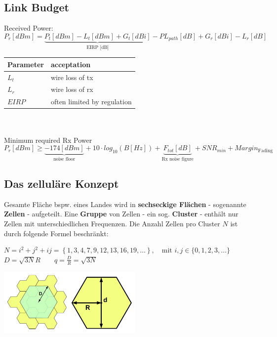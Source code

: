 \subsection{Link Budget}
Received Power:
\begin{equation}
	P_r [dBm] = \underbrace{P_t [dBm] - L_t [dBm] + G_t[dBi]}_{ \text{EIRP [dB]} } - PL_{path}[dB] + G_r[dBi] -L_r[dB]
\end{equation}

\begin{tabular}{ll}
\textbf{Parameter} & \textbf{acceptation} \\ \hline
$L_t$ & wire loss of tx \\ 
$L_r$ & wire loss of rx \\ 
$EIRP$ & often limited by regulation \\ 
\end{tabular} \\ \\

Minimum required Rx Power
\begin{equation}
	P_r [dBm] \geq \underbrace{-174[dBm]}_{ \text{noise floor} } + 10 \cdot log_{10}(B [Hz]) + \underbrace{F_{tot}[dB]}_{ \text{Rx noise figure} } + SNR_{min} + Margin_{ \text{Fading} }
\end{equation}

\subsection{Das zelluläre Konzept }
	\begin{minipage}{12cm}
		Gesamte Fläche bspw. eines Landes wird in \textbf{sechseckige Flächen} - sogenannte \textbf{Zellen} - aufgeteilt. 
		Eine \textbf{Gruppe} von Zellen - ein sog. \textbf{Cluster} - enthält nur Zellen mit unterschiedlichen Frequenzen.
		Die Anzahl Zellen pro Cluster $N$ ist durch folgende Formel beschränkt:
		\begin{center}
	        $ N=i^2+j^2+ij = \left\{1,3,4,7,9,12,13,16,19,\ldots\right\}, \quad \text{mit } i,j \in
	        \{0,1,2,3,\ldots \} $ \\ $ D = \sqrt{3N} R \qquad q = \frac{D}{R} =
	        \sqrt{3N} $
        \end{center}
	\end{minipage}
	\begin{minipage}{8cm}
	    \includegraphics[width=7cm]{./bilder/systems-cluster.png}
	\end{minipage}

